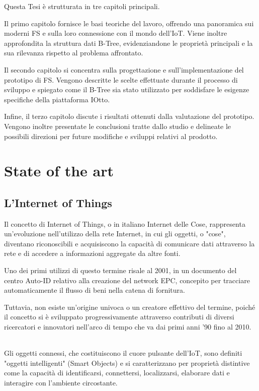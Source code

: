 \documentclass[12pt,a4paper,openright,twoside]{book}
\begin{document}
        Questa Tesi è strutturata in tre capitoli principali.

        Il primo capitolo fornisce le basi teoriche del lavoro, offrendo una panoramica sui moderni \ac{FS} e sulla loro connessione con il mondo dell’\ac{IoT}.
        Viene inoltre approfondita la struttura dati B-Tree, evidenziandone le proprietà principali e la sua rilevanza rispetto al problema affrontato.

        Il secondo capitolo si concentra sulla progettazione e sull’implementazione del prototipo di \ac{FS}.
        Vengono descritte le scelte effettuate durante il processo di sviluppo e spiegato come il B-Tree sia stato utilizzato per soddisfare le esigenze specifiche della piattaforma IOtto.

        Infine, il terzo capitolo discute i risultati ottenuti dalla valutazione del prototipo. Vengono inoltre presentate le conclusioni tratte dallo studio e delineate le possibili direzioni per future modifiche e sviluppi relativi al prodotto.

\chapter{State of the art}

    \section{L'Internet of Things}

        Il concetto di Internet of Things, o in italiano Internet delle Cose, rappresenta un'evoluzione nell'utilizzo della rete Internet, in cui gli oggetti, o "cose", diventano riconoscibili e acquisiscono la capacità di comunicare dati attraverso la rete e di accedere a informazioni aggregate da altre fonti.

        Uno dei primi utilizzi di questo termine risale al 2001, in un documento del centro Auto-ID relativo alla creazione del network EPC, concepito per tracciare automaticamente il flusso di beni nella catena di fornitura.

        Tuttavia, non esiste un'origine univoca o un creatore effettivo del termine, poiché il concetto si è sviluppato progressivamente attraverso contributi di diversi ricercatori e innovatori nell'arco di tempo che va dai primi anni '90 fino al 2010.

        \subparagraph*{}

        Gli oggetti connessi, che costituiscono il cuore pulsante dell’\ac{IoT}, sono definiti "oggetti intelligenti" (Smart Objects) e si caratterizzano per proprietà distintive come la capacità di identificarsi, connettersi, localizzarsi, elaborare dati e interagire con l'ambiente circostante.
\end{document}
